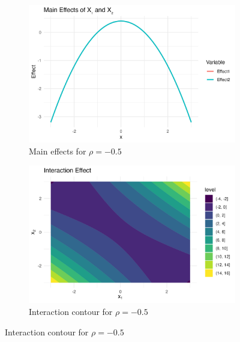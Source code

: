 \begin{figure}[htpb]
    \centering
    \begin{subfigure}[t]{0.49\textwidth}
        \centering
        \includegraphics[width=\textwidth]{images/interaction_a1p00_a2p00_a11p00_a22p00_a12p10_rhom05_main.png}
        \caption{Main effects for $\rho = -0.5$}
    \end{subfigure}%
    \hfill
    \begin{subfigure}[t]{0.49\textwidth}
        \centering
        \includegraphics[width=\textwidth]{images/interaction_a1p00_a2p00_a11p00_a22p00_a12p10_rhom05_interaction.png}
        \caption{Interaction contour for $\rho = -0.5$}
    \end{subfigure}


\end{figure}
